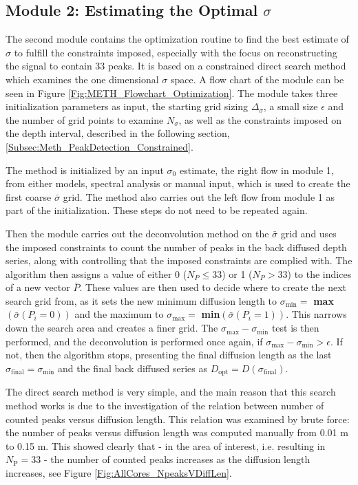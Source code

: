 \documentclass[../../CompleteThesis2/Complete_2ndDraft]{subfiles}
\begin{document}
\subsection[Module 2]{Module 2: Estimating the Optimal $\sigma$}
\label{Subsec:Method_SigmaMethod_Module2}
The second module contains the optimization routine to find the best estimate of $\sigma$ to fulfill the constraints imposed, especially with the focus on reconstructing the signal to contain 33 peaks. It is based on a constrained direct search method which examines the one dimensional $\sigma$ space. A flow chart of the module can be seen in Figure \ref{Fig:METH_Flowchart_Optimization}. The module takes three initialization parameters as input, the starting grid sizing $\Delta_{\sigma}$, a small size $\epsilon$ and the number of grid points to examine $N_{\sigma}$, as well as the constraints imposed on the depth interval, described in the following section, \ref{Subsec:Meth_PeakDetection_Constrained}.



The method is initialized by an input $\sigma_0$ estimate, the right flow in module 1, from either models, spectral analysis or manual input, which is used to create the first coarse $\bar{\sigma}$ grid. The method also carries out the left flow from module 1 as part of the initialization. These steps do not need to be repeated again.

Then the module carries out the deconvolution method on the $\bar{\sigma}$ grid and uses the imposed constraints to count the number of peaks in the back diffused depth series, along with controlling that the imposed constraints are complied with. The algorithm then assigns a value of either 0 ($N_{P} \leq 33$) or 1 ($N_{P}>33$) to the indices of a new vector $\bar{P}$. These values are then used to decide where to create the next search grid from, as it sets the new minimum diffusion length to $\sigma_{\text{min}}=$ \textbf{max}$(\bar{\sigma}(P_i=0))$ and the maximum to $\sigma_{\text{max}}=$ \textbf{min}$(\bar{\sigma}(P_i=1))$. This narrows down the search area and creates a finer grid. The $\sigma_{\text{max}} - \sigma_{\text{min}}$ test is then performed, and the deconvolution is performed once again, if $\sigma_{\text{max}} - \sigma_{\text{min}} >\epsilon$. If not, then the algorithm stops, presenting the final diffusion length as the last $\sigma_{\text{final}} = \sigma_{\text{min}}$ and the final back diffused series as $D_{\text{opt}}=D(\sigma_{\text{final}})$.

The direct search method is very simple, and the main reason that this search method works is due to the investigation of the relation between number of counted peaks versus diffusion length. This relation was examined by brute force: the number of peaks versus diffusion length was computed manually from 0.01 m to 0.15 m. This showed clearly that - in the area of interest, i.e. resulting in $N_{\text{P}}=33$ - the number of counted peaks increases as the diffusion length increases, see Figure \ref{Fig:AllCores_NpeaksVDiffLen}. 
\end{document}
